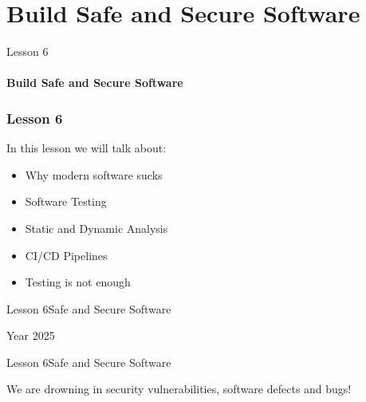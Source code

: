 \documentclass[aspectratio=1610]{beamer}
\begin{document}
\section{Build Safe and Secure Software}

\begin{frame}
\begin{center}
\Huge Lesson 6\\~\\
\textbf{Build Safe and Secure Software}
\end{center}
\end{frame}



\begin{frame}
\frametitle{Lesson 6}
\Huge In this lesson we will talk about:\\
\huge
\begin{itemize}
 \item \alert{Why modern software sucks}\\
 \item \alert{Software Testing}\\
 \item \alert{Static and Dynamic Analysis}\\
 \item \alert{CI/CD Pipelines}\\
 \item \alert{Testing is not enough}
\end{itemize}
\end{frame}


\begin{frame}{Lesson 6}{Safe and Secure Software}
\Huge
\begin{center}
Year 2025
\end{center}
\end{frame}


\begin{frame}{Lesson 6}{Safe and Secure Software}
\Huge
\begin{center}
We are drowning in security vulnerabilities, software defects and bugs! 
\end{center}
\end{frame}


\begin{frame}
\end{frame}
\end{document}
